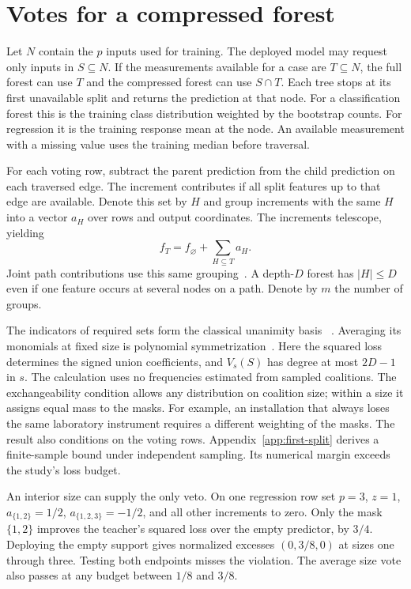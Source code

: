 \section{Votes for a compressed forest}
Let $N$ contain the $p$ inputs used for training. The deployed model may request
only inputs in $S\subseteq N$. If the measurements available for a case are
$T\subseteq N$, the full forest can use $T$ and the compressed forest can use
$S\cap T$. Each tree stops at its first unavailable split and returns the
prediction at that node. For a classification forest this is the training
class distribution weighted by the bootstrap counts. For regression it is
the training response mean at the node. An available measurement with a
missing value uses the training median before traversal.

For each voting row, subtract the parent prediction from the child prediction
on each traversed edge. The increment contributes if all split features up
to that edge are available. Denote this set by $H$ and group increments with
the same $H$ into a vector $a_H$ over rows and output coordinates. The
increments telescope, yielding
\[
 f_T=f_\varnothing+\sum_{H\subseteq T}a_H.
\]
Joint path contributions use this same grouping~\citep{palczewska2013forest,
saabasTreeInterpreter}. A depth-$D$ forest has $|H|\le D$ even if one
feature occurs at several nodes on a path. Denote by $m$ the number of groups.



The indicators of required sets form the classical unanimity basis
~\citep{grabisch2000representations}. Averaging its monomials at fixed size
is polynomial symmetrization~\citep[Lemma~3.2]{beals2001symmetry}. Here
the squared loss determines the signed union coefficients, and
$V_s(S)$ has degree at most $2D-1$ in $s$.
The calculation uses no frequencies estimated from sampled coalitions. The
exchangeability condition allows any distribution on coalition size; within
a size it assigns equal mass to the masks. For example, an installation
that always loses the same laboratory instrument requires a different
weighting of the masks. The result also conditions on the voting rows.
Appendix~\ref{app:first-split} derives a finite-sample bound under independent
sampling. Its numerical margin exceeds the study's loss budget.

An interior size can supply the only veto. On one regression row set $p=3$,
$z=1$, $a_{\{1,2\}}=1/2$, $a_{\{1,2,3\}}=-1/2$, and all other increments
to zero. Only the mask $\{1,2\}$ improves the teacher's squared loss over the
empty predictor, by $3/4$. Deploying the empty support gives normalized
excesses $(0,3/8,0)$ at sizes one through three. Testing both endpoints misses
the violation. The average size vote also passes at any budget between $1/8$
and $3/8$.

